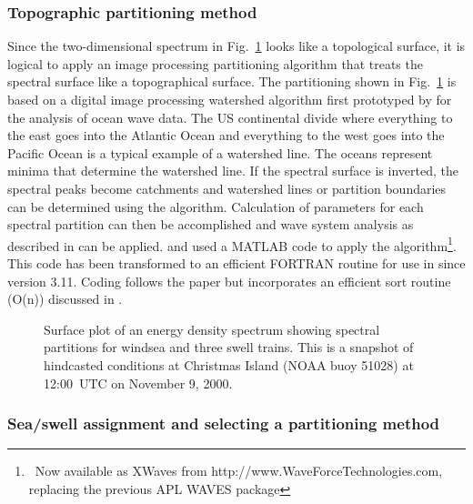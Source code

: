 \subsubsection{Topographic partitioning method}

Since the two-dimensional spectrum in Fig.~\ref{fig:partitions} looks like a
topological surface, it is logical to apply an image processing partitioning
algorithm that treats the spectral surface like a topographical surface.  The
partitioning shown in Fig.~\ref{fig:partitions} is based on a digital image
processing watershed algorithm \citep{art:VS91} first prototyped by
\cite{pro:HJ04} for the analysis of ocean wave data. 
The US continental divide where everything to the east goes into the Atlantic
Ocean and everything to the west goes into the Pacific Ocean is a typical
example of a watershed line.  The oceans represent minima that determine the
watershed line.  If the spectral surface is inverted, the spectral peaks
become catchments and watershed lines or partition boundaries can be
determined using the \cite{art:VS91} algorithm.  Calculation of parameters for
each spectral partition can then be accomplished and wave system analysis as
described in \cite{art:HP01} can be applied.  \cite{pro:HJ04} and
\cite{tol:Vict06b} used a MATLAB code to apply the \cite{art:VS91}
algorithm\footnote{~Now available as XWaves from
http://www.WaveForceTechnologies.com, replacing the previous APL WAVES
package}.  This code has been transformed to an efficient FORTRAN routine for
use in \ws since version 3.11.  Coding follows the
\cite{art:VS91} paper but incorporates an efficient sort routine (O(n))
discussed in \cite{rep:TTH06}.

\begin{figure} \begin{center}
\caption{Surface plot of an energy density spectrum showing spectral
         partitions for windsea and three swell trains.  This is a snapshot of
         hindcasted conditions at Christmas Island (NOAA buoy 51028) at
         12:00~UTC on November 9, 2000.}
         \label{fig:partitions} \botline
\end{center}
\end{figure}

\subsubsection{Sea/swell assignment and selecting a partitioning method}

